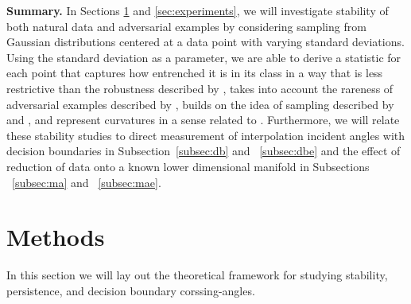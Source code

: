
{\bf Summary.}
 In Sections \ref{sec:meth} and \ref{sec:experiments}, we will investigate stability of both natural data and adversarial examples by considering sampling from Gaussian distributions centered at a data point with varying standard deviations. Using the standard deviation as a parameter, we are able to derive a statistic for each point that captures how entrenched it is in its class in a way that is less restrictive than the robustness described by \citet{khoury2018}, takes into account the rareness of adversarial examples described by \citet{yu2019new}, builds on the idea of sampling described by \citet{roth19aodds} and \citet{hosseini2019odds}, and represent curvatures in a sense related to \citet{Fawzi2018empirical}. Furthermore, we will relate these stability studies to direct measurement of interpolation incident angles with decision boundaries in Subsection~\ref{subsec:db} and ~\ref{subsec:dbe} and the effect of reduction of data onto a known lower dimensional manifold in Subsections ~\ref{subsec:ma} and ~\ref{subsec:mae}.  


\section{Methods} \label{sec:meth} %

In this section we will lay out the theoretical framework for studying stability, persistence, and decision boundary corssing-angles. 

